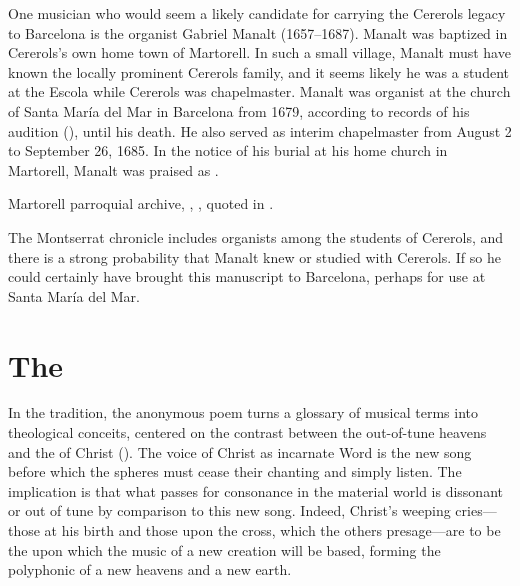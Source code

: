 One musician who would seem a likely candidate for carrying the Cererols legacy
to Barcelona is the organist Gabriel Manalt (1657--1687).%
    \Autocite{Balanza:CererolsFamily}
Manalt was baptized in Cererols's own home town of Martorell.
In such a small village, Manalt must have known the locally prominent Cererols
family, and it seems likely he was a student at the Escola while Cererols was
chapelmaster.
Manalt was organist at the church of Santa María del Mar in Barcelona from 1679,
according to records of his audition (), until his death.
He also served as interim chapelmaster from August 2 to September 26, 1685.%
    \Autocite[70--71]{Balanza:CererolsFamily}
In the notice of his burial at his home church in Martorell, Manalt was praised
as .%
\begin{Footnote}
    Martorell parroquial archive, ,
    , quoted in 
    \autocite[70]{Balanza:CererolsFamily}.
\end{Footnote}
The Montserrat chronicle includes organists among the students of Cererols, and
there is a strong probability that Manalt knew or studied with Cererols.
If so he could certainly have brought this manuscript to Barcelona, perhaps for
use at Santa María del Mar.



\section{The }

In the  tradition, the anonymous poem turns a glossary of
musical terms into theological conceits, centered on the contrast between the
out-of-tune heavens and the  of Christ
().
The voice of Christ as incarnate Word is the new song before which the spheres
must cease their chanting and simply listen.
The implication is that what passes for consonance in the material world is
dissonant or out of tune by comparison to this new song.
Indeed, Christ's weeping cries---those at his birth and those upon the cross,
which the others presage---are to be the  upon which the
music of a new creation will be based, forming the polyphonic 
of a new heavens and a new earth.

